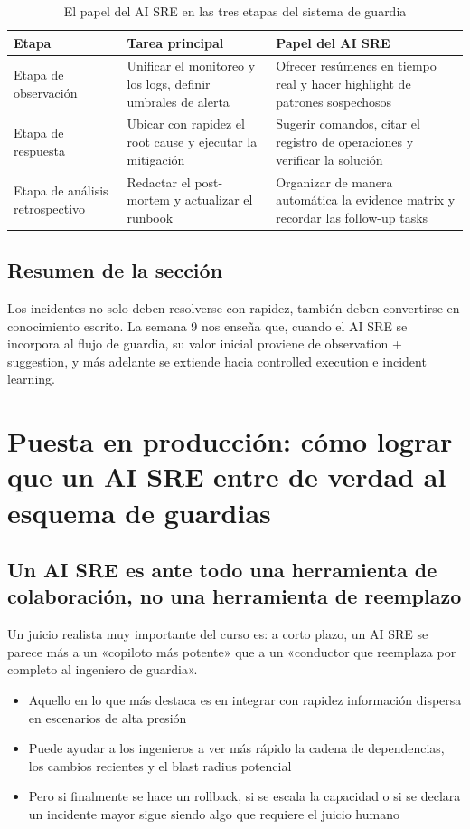 \documentclass[a4paper]{article}
\begin{document}
\begin{table}[H]
\centering
\begin{tabular}{p{} p{} p{}}
\toprule
Etapa & Tarea principal & Papel del AI SRE \\
\midrule
Etapa de observación & Unificar el monitoreo y los logs, definir umbrales de alerta & Ofrecer resúmenes en tiempo real y hacer highlight de patrones sospechosos \\
Etapa de respuesta & Ubicar con rapidez el root cause y ejecutar la mitigación & Sugerir comandos, citar el registro de operaciones y verificar la solución \\
Etapa de análisis retrospectivo & Redactar el post-mortem y actualizar el runbook & Organizar de manera automática la evidence matrix y recordar las follow-up tasks \\
\bottomrule
\end{tabular}
\caption{El papel del AI SRE en las tres etapas del sistema de guardia}
\end{table}

\subsection{Resumen de la sección}

Los incidentes no solo deben resolverse con rapidez, también deben convertirse en conocimiento escrito. La semana 9 nos enseña que, cuando el AI SRE se incorpora al flujo de guardia, su valor inicial proviene de observation + suggestion, y más adelante se extiende hacia controlled execution e incident learning.
\section{Puesta en producción: cómo lograr que un AI SRE entre de verdad al esquema de guardias}

\subsection{Un AI SRE es ante todo una herramienta de colaboración, no una herramienta de reemplazo}

Un juicio realista muy importante del curso es: a corto plazo, un AI SRE se parece más a un «copiloto más potente» que a un «conductor que reemplaza por completo al ingeniero de guardia».

\begin{itemize}
    \item Aquello en lo que más destaca es en integrar con rapidez información dispersa en escenarios de alta presión
    \item Puede ayudar a los ingenieros a ver más rápido la cadena de dependencias, los cambios recientes y el blast radius potencial
    \item Pero si finalmente se hace un rollback, si se escala la capacidad o si se declara un incidente mayor sigue siendo algo que requiere el juicio humano
\end{itemize}
\end{document}
